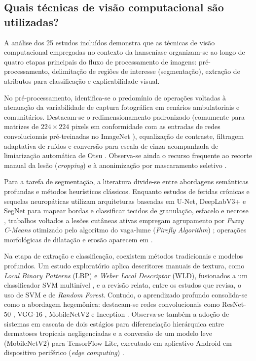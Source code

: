 \subsection{Quais técnicas de visão computacional são utilizadas?}
\label{subsec:rq1-tecnicas}

A análise dos 25 estudos incluídos demonstra que as técnicas de visão computacional
empregadas no contexto da hanseníase organizam-se ao longo de quatro etapas principais
do fluxo de processamento de imagens: pré-processamento, delimitação de regiões de
interesse (segmentação), extração de atributos para classificação e explicabilidade visual.

No pré-processamento, identifica-se o predomínio de operações voltadas à atenuação
da variabilidade de captura fotográfica em cenários ambulatoriais e comunitários.
Destacam-se o redimensionamento padronizado (comumente para matrizes de $224 \times 224$
pixels em conformidade com as entradas de redes convolucionais pré-treinadas no ImageNet
), equalização de contraste, filtragem adaptativa de ruídos e
conversão para escala de cinza acompanhada de limiarização automática de Otsu
. Observa-se ainda o recurso frequente ao recorte manual
da lesão (\textit{cropping}) e à anonimização por mascaramento seletivo .

Para a tarefa de segmentação, a literatura divide-se entre abordagens semânticas profundas
e métodos heurísticos clássicos. Enquanto estudos de feridas crônicas e sequelas neuropáticas
utilizam arquiteturas baseadas em U-Net, DeepLabV3+ e SegNet para mapear bordas e classificar
tecidos de granulação, esfacelo e necrose , trabalhos voltados
a lesões cutâneas ativas empregam agrupamento por \textit{Fuzzy C-Means} otimizado pelo
algoritmo do vaga-lume (\textit{Firefly Algorithm}) ; operações morfológicas de
dilatação e erosão aparecem em .

Na etapa de extração e classificação, coexistem métodos tradicionais e modelos profundos.
Um estudo exploratório aplica descritores manuais de textura, como \textit{Local Binary Patterns}
(LBP) e \textit{Weber Local Descriptor} (WLD), fusionados a um classificador SVM multinível
, e a revisão  relata, entre os estudos que revisa, o uso de SVM e de
\textit{Random Forest}. Contudo, o aprendizado profundo
consolida-se como a abordagem hegemônica: destacam-se redes convolucionais como ResNet-50
, VGG-16 , MobileNetV2  e Inception . Observa-se também a adoção
de sistemas em cascata de dois estágios para diferenciação hierárquica entre dermatoses
tropicais negligenciadas  e a conversão de um modelo leve (MobileNetV2) para TensorFlow Lite, executado
em aplicativo Android em dispositivo periférico (\textit{edge computing}) .

